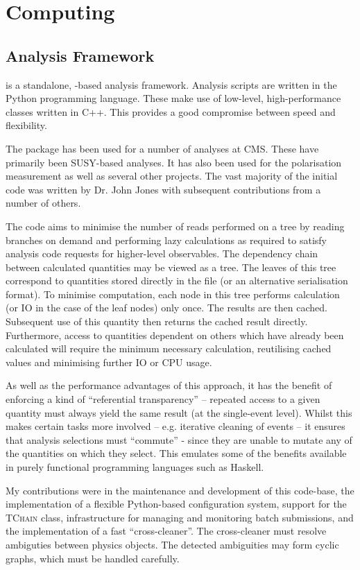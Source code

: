 \chapter{Computing}
\section{ Analysis Framework}
 is a standalone, \root-based analysis framework. Analysis
scripts are written in the Python programming language. These make use of
low-level, high-performance classes written in C++. This provides a good
compromise between speed and flexibility.

The  package has been used for a number of analyses at
\ac{CMS}. These have primarily been \ac{SUSY}-based analyses. It has also been
used for the \PW polarisation measurement as well as several other projects. The
vast majority of the initial code was written by Dr. John Jones with subsequent
contributions from a number of others.

The  code aims to minimise the number of reads performed on a
\root tree by reading branches on demand and performing lazy calculations as
required to satisfy analysis code requests for higher-level observables. The
dependency chain between calculated quantities may be viewed as a tree. The
leaves of this tree correspond to quantities stored directly in the \root
file (or an alternative serialisation format). To minimise computation, each
node in this tree performs calculation (or \ac{IO} in the case of the leaf nodes)
only once. The results are then cached. Subsequent use of this quantity then
returns the cached result directly. Furthermore, access to quantities dependent
on others which have already been calculated will require the minimum necessary
calculation, reutilising cached values and minimising further \ac{IO} or CPU
usage.

As well as the performance advantages of this approach, it has the benefit of
enforcing a kind of ``referential transparency'' -- repeated access to a given
quantity must always yield the same result (at the single-event level). Whilst
this makes certain tasks more involved -- e.g. iterative cleaning of events --
it ensures that analysis selections must ``commute'' - since they are unable to
mutate any of the quantities on which they select. This emulates some of the
benefits available in purely functional programming languages such as Haskell.

My contributions were in the maintenance and development of this code-base, the
implementation of a flexible Python-based configuration system, support for the
\root \textsc{TChain} class, infrastructure for managing and monitoring
batch submissions, and the implementation of a fast ``cross-cleaner''. The
cross-cleaner must resolve ambiguties between physics objects. The detected
ambiguities may form cyclic graphs, which must be handled carefully.
